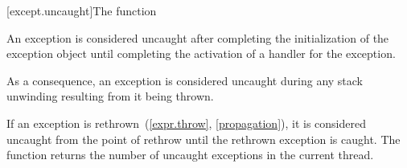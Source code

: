 [except.uncaught]{The  function}%

\pnum
An exception is considered uncaught
after completing the initialization of the exception object
until completing the activation of a handler for the exception.
\begin{note}
As a consequence, an exception is considered uncaught
during any stack unwinding resulting from it being thrown.
\end{note}
If an exception is rethrown~(\ref{expr.throw}, \ref{propagation}),
it is considered uncaught from the point of rethrow
until the rethrown exception is caught.
The function 
returns the number of uncaught exceptions in the current thread.%
